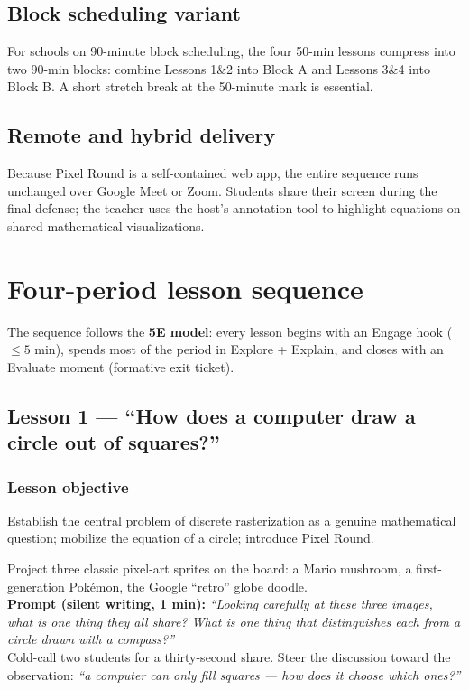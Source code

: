 \documentclass[12pt,letterpaper]{scrartcl}
\newcommand{\acc}[1]{\textcolor{accent}{\textbf{#1}}}
\newcommand{\timing}[1]{\textnormal{\footnotesize\color{bg!90!white}\textsf{#1}}}
\begin{document}
\subsection{Block scheduling variant}
For schools on 90-minute block scheduling, the four 50-min lessons compress into two 90-min blocks: combine Lessons 1\&2 into Block A and Lessons 3\&4 into Block B. A short stretch break at the 50-minute mark is essential.

\subsection{Remote and hybrid delivery}
Because Pixel Round is a self-contained web app, the entire sequence runs unchanged over Google Meet or Zoom. Students share their screen during the final defense; the teacher uses the host's annotation tool to highlight equations on shared mathematical visualizations.

\section{Four-period lesson sequence}

The sequence follows the \acc{5E model}: every lesson begins with an Engage hook ($\leq 5$ min), spends most of the period in Explore + Explain, and closes with an Evaluate moment (formative exit ticket).

\subsection{Lesson 1 --- ``How does a computer draw a circle out of squares?''}\label{lesson1}

\subsubsection*{Lesson objective}
Establish the central problem of discrete rasterization as a genuine mathematical question; mobilize the equation of a circle; introduce Pixel Round.

\medskip

\begin{activity}[1.1 --- Engage: Do Now \quad\timing{5 min}]
Project three classic pixel-art sprites on the board: a Mario mushroom, a first-generation Pokémon, the Google ``retro'' globe doodle. \\[0.4em]
\textbf{Prompt (silent writing, 1 min):} \emph{``Looking carefully at these three images, what is one thing they all share? What is one thing that distinguishes each from a circle drawn with a compass?''} \\[0.4em]
Cold-call two students for a thirty-second share. Steer the discussion toward the observation: \emph{``a computer can only fill squares --- how does it choose which ones?''}
\end{activity}
\end{document}
